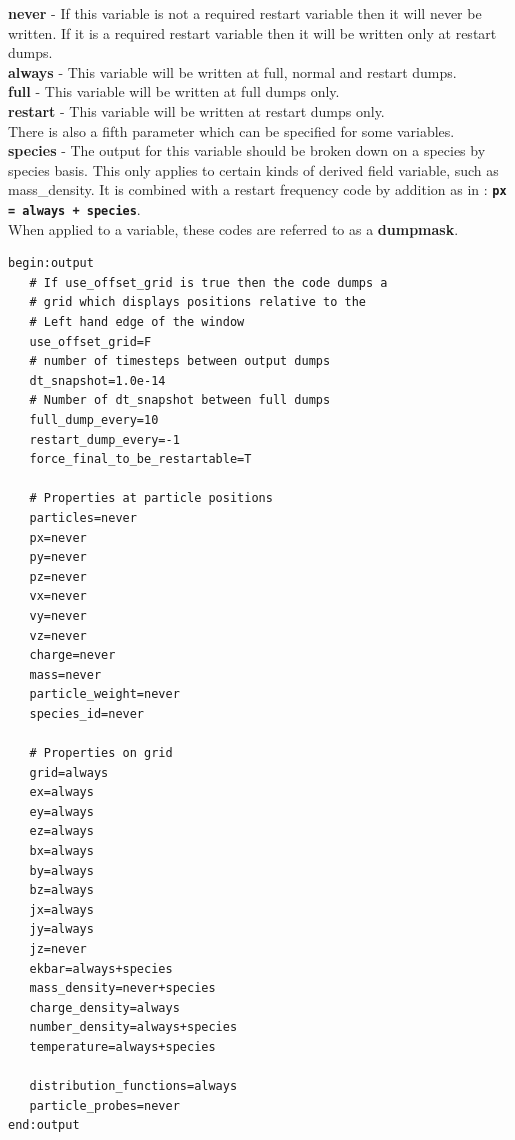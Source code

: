 \documentclass[12pt,a4paper]{article}
\newcommand{\emphtext}{\color{warwickdark} \fontfamily{phv}\selectfont\Large\bf}
\newcommand{\boxverbatim}[1]{\begin{Verbatim}[obeytabs=true,frame=single,
  framerule=0.5mm,rulecolor=\color{warwickmid},formatcom=\color{black},label=#1]}
\newcommand{\inlinecode}[1]{{\color{warwickred} \bf\texttt{#1}}}
\newcommand{\inlineemph}[1]{{\color{warwicklight} \bf{#1}}}
\begin{document}
{\emphtext never} - If this variable is not a required restart variable then it
will never be written. If it is a required restart variable then it will be
written only at restart dumps.\\

{\emphtext always} - This variable will be written at full, normal and restart
dumps.\\

{\emphtext full} - This variable will be written at full dumps only.\\

{\emphtext restart} - This variable will be written at restart dumps only.\\

There is also a fifth parameter which can be specified for some variables.\\

{\emphtext species} - The output for this variable should be broken down on a
species by species basis. This only applies to certain kinds of derived field
variable, such as mass\_density. It is combined with a restart frequency code
by addition as in : \inlinecode{px = always + species}.\\

When applied to a variable, these codes are referred to as a
\inlineemph{dumpmask}.\\

\boxverbatim{output block}
begin:output
   # If use_offset_grid is true then the code dumps a
   # grid which displays positions relative to the
   # Left hand edge of the window
   use_offset_grid=F
   # number of timesteps between output dumps
   dt_snapshot=1.0e-14
   # Number of dt_snapshot between full dumps
   full_dump_every=10
   restart_dump_every=-1
   force_final_to_be_restartable=T

   # Properties at particle positions
   particles=never
   px=never
   py=never
   pz=never
   vx=never
   vy=never
   vz=never
   charge=never
   mass=never
   particle_weight=never
   species_id=never

   # Properties on grid
   grid=always
   ex=always
   ey=always
   ez=always
   bx=always
   by=always
   bz=always
   jx=always
   jy=always
   jz=never
   ekbar=always+species
   mass_density=never+species
   charge_density=always
   number_density=always+species
   temperature=always+species

   distribution_functions=always
   particle_probes=never
end:output
\end{Verbatim}
\end{document}
